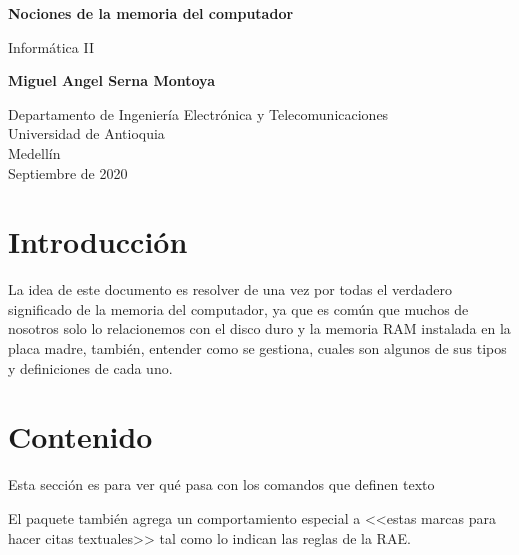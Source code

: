 \documentclass{article}
\begin{document}
\begin{titlepage}
    \begin{center}
        \vspace*{1cm}
            
        \Huge
        \textbf{Nociones de la memoria del computador}
            
        \vspace{0.5cm}
        \LARGE
        Informática II
            
        \vspace{1.5cm}
            
        \textbf{Miguel Angel Serna Montoya}
            
        \vfill
            
        \vspace{0.8cm}
            
        \Large
        Departamento de Ingeniería Electrónica y Telecomunicaciones\\
        Universidad de Antioquia\\
        Medellín\\
        Septiembre de 2020
            
    \end{center}
\end{titlepage}

\tableofcontents

\section{Introducción} \label{Introducción}
La idea de este documento es resolver de una vez por todas el verdadero significado de la memoria del computador, ya que es común que muchos de nosotros solo lo relacionemos con el disco duro y la memoria RAM instalada en la placa madre, también, entender como se gestiona, cuales son algunos de sus tipos y definiciones de cada uno.


\section{Contenido} \label{Contenido}

Esta sección es para ver qué pasa con los comandos 
que definen texto

El paquete también agrega un comportamiento especial 
a <<estas marcas para hacer citas textuales>> tal como 
lo indican las reglas de la RAE. \cite{dirac}
\end{document}
